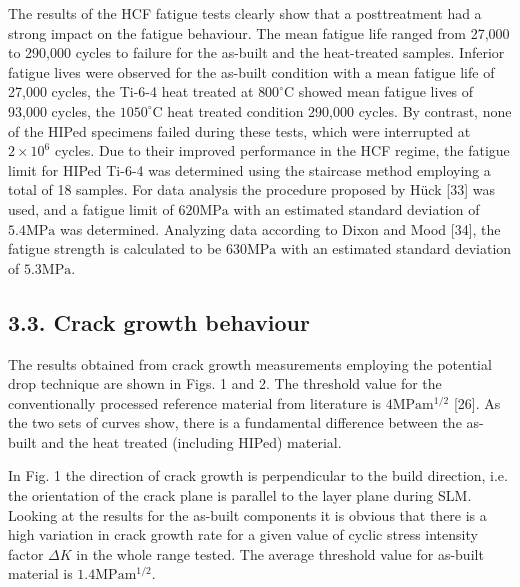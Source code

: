 \documentclass[10pt]{article}
\begin{document}
The results of the HCF fatigue tests clearly show that a posttreatment had a strong impact on the fatigue behaviour. The mean fatigue life ranged from 27,000 to 290,000 cycles to failure for the as-built and the heat-treated samples. Inferior fatigue lives were observed for the as-built condition with a mean fatigue life of 27,000 cycles, the Ti-6-4 heat treated at $800^{\circ} \mathrm{C}$ showed mean fatigue lives of 93,000 cycles, the $1050^{\circ} \mathrm{C}$ heat treated condition 290,000 cycles. By contrast, none of the HIPed specimens failed during these tests, which were interrupted at $2 \times 10^{6}$ cycles. Due to their improved performance in the HCF regime, the fatigue limit for HIPed Ti-6-4 was determined using the staircase method employing a total of 18 samples. For data analysis the procedure proposed by Hück [33] was used, and a fatigue limit of $620 \mathrm{MPa}$ with an estimated standard deviation of $5.4 \mathrm{MPa}$ was determined. Analyzing data according to Dixon and Mood [34], the fatigue strength is calculated to be $630 \mathrm{MPa}$ with an estimated standard deviation of $5.3 \mathrm{MPa}$.

\subsection*{3.3. Crack growth behaviour}
The results obtained from crack growth measurements employing the potential drop technique are shown in Figs. 1 and 2. The threshold value for the conventionally processed reference material from literature is $4 \mathrm{MPa} \mathrm{m}{ }^{1 / 2}$ [26]. As the two sets of curves show, there is a fundamental difference between the as-built and the heat treated (including HIPed) material.

In Fig. 1 the direction of crack growth is perpendicular to the build direction, i.e. the orientation of the crack plane is parallel to the layer plane during SLM. Looking at the results for the as-built components it is obvious that there is a high variation in crack growth rate for a given value of cyclic stress intensity factor $\Delta K$ in the whole range tested. The average threshold value for as-built material is $1.4 \mathrm{MPa} \mathrm{m}^{1 / 2}$.
\end{document}

